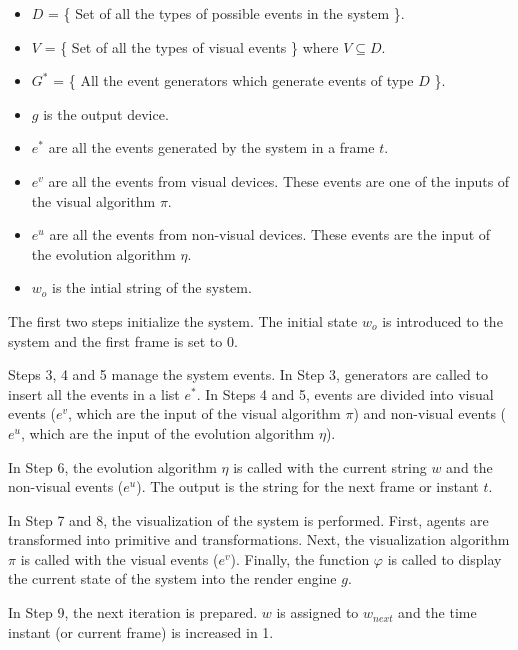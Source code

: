 \documentclass[runningheads]{llncs}
\begin{document}
\begin{itemize}
    \item $D$ = \{ Set of all the types of possible events in the system \}.

    \item $V$ = \{ Set of all the types of visual events \} where $V \subseteq D$.

    \item $G^*$ = \{ All the event generators which generate events of type $D$ \}.

    \item $g$ is the output device.

    \item $e^*$ are all the events generated by the system in a frame $t$.

    \item $e^v$ are all the events from visual devices. These events are one of 
the inputs of the visual algorithm $\pi$.

    \item $e^u$ are all the events from non-visual devices. These events
are the input of the evolution algorithm $\eta$.

    \item $w_o$ is the intial string of the system.
\end{itemize}
	


The first two steps initialize the system. The initial state $w_o$ is
introduced to the system and the first frame is set to 0.

Steps 3, 4 and 5 manage the system events. In Step 3, generators are called to insert all the
events in a list $e^*$. In Steps 4 and 5, events are divided into visual events ($e^v$, which are
the input of the visual algorithm $\pi$) and non-visual events ($e^u$, which are the input of the
evolution algorithm $\eta$).

In Step 6, the evolution algorithm $\eta$ is called with the current string $w$ and the non-visual
events ($e^u$). The output is the string for the next frame or instant $t$.

In Step 7 and 8, the visualization of the system is performed. First, agents are transformed into
primitive and transformations. Next, the visualization algorithm $\pi$ is called with the visual
events ($e^v$). Finally, the function $\varphi$ is called to display the current state of the
system into the render engine $g$.
	
In Step 9, the next iteration is prepared. $w$ is assigned to $w_{next}$ and the time instant (or
current frame) is increased in 1.
\end{document}
